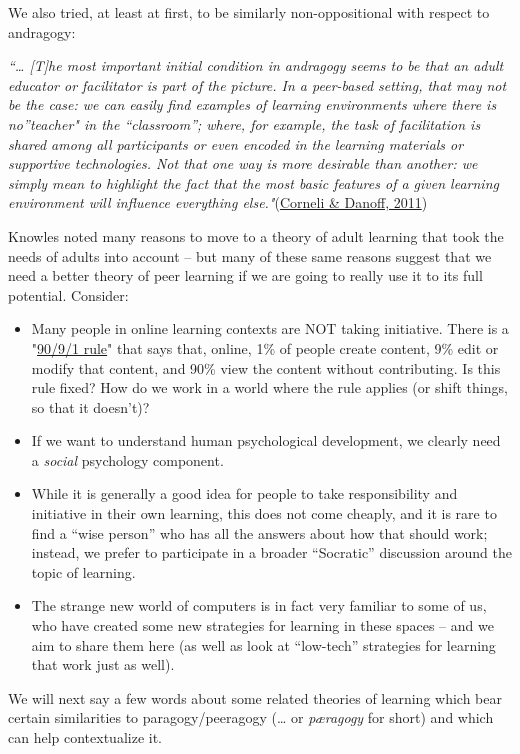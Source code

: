 We also tried, at least at first, to be similarly non-oppositional with
respect to andragogy:

\emph{``\ldots{} {[}T{]}he most important initial condition in andragogy
seems to be that an adult educator or facilitator is part of the
picture. In a peer-based setting, that may not be the case: we can
easily find examples of learning environments where there is
no''teacher" in the ``classroom''; where, for example, the task of
facilitation is shared among all participants or even encoded in the
learning materials or supportive technologies. Not that one way is more
desirable than another: we simply mean to highlight the fact that the
most basic features of a given learning environment will influence
everything else."}(\href{http://paragogy.net/ParagogyPaper1}{Corneli \&
Danoff, 2011})

Knowles noted many reasons to move to a theory of adult learning that
took the needs of adults into account -- but many of these same reasons
suggest that we need a better theory of peer learning if we are going to
really use it to its full potential. Consider:

\begin{itemize}
\item
  Many people in online learning contexts are NOT taking initiative.
  There is a
  "\href{http://www.useit.com/alertbox/participation\_inequality.html}{90/9/1
  rule}" that says that, online, 1\% of people create content, 9\% edit
  or modify that content, and 90\% view the content without
  contributing. Is this rule fixed? How do we work in a world where the
  rule applies (or shift things, so that it doesn't)?
\item
  If we want to understand human psychological development, we clearly
  need a \emph{social} psychology component.
\item
  While it is generally a good idea for people to take responsibility
  and initiative in their own learning, this does not come cheaply, and
  it is rare to find a ``wise person'' who has all the answers about how
  that should work; instead, we prefer to participate in a broader
  ``Socratic'' discussion around the topic of learning.
\item
  The strange new world of computers is in fact very familiar to some of
  us, who have created some new strategies for learning in these spaces
  -- and we aim to share them here (as well as look at ``low-tech''
  strategies for learning that work just as well).
\end{itemize}
We will next say a few words about some related theories of learning
which bear certain similarities to paragogy/peeragogy (\ldots{} or
\emph{pæragogy} for short) and which can help contextualize it.

